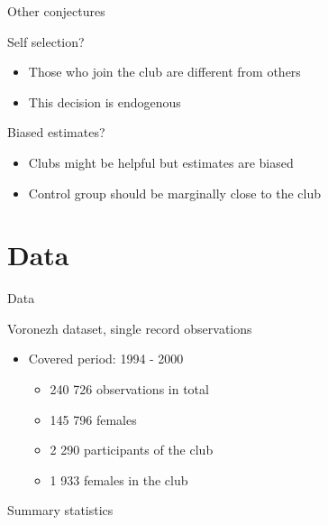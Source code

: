 \documentclass{beamer}
\begin{document}
\begin{frame}{Other conjectures}
\begin{block}{Self selection?}
\begin{itemize}
    \item Those who join the club are different from others
    \item This decision is endogenous
\end{itemize}
\end{block}

\begin{block}{Biased estimates?}
\begin{itemize}
    \item Clubs might be helpful but estimates are biased
    \item Control group should be marginally close to the club
\end{itemize}
\end{block}
\end{frame}

\section{Data}

\begin{frame}{Data}
\begin{block}{Voronezh dataset, single record observations}
\begin{itemize}
    \item Covered period: 1994 - 2000
        \begin{itemize}
            \item  240 726 observations in total
            \item  145 796 females
            \item  2 290 participants of the club
            \item  1 933 females in the club
        \end{itemize}
\end{itemize}
\end{block}
\end{frame}







\begin{frame}{Summary statistics}
\centering
\resizebox{0.9\linewidth}{!}{

}
\end{frame}
\end{document}
